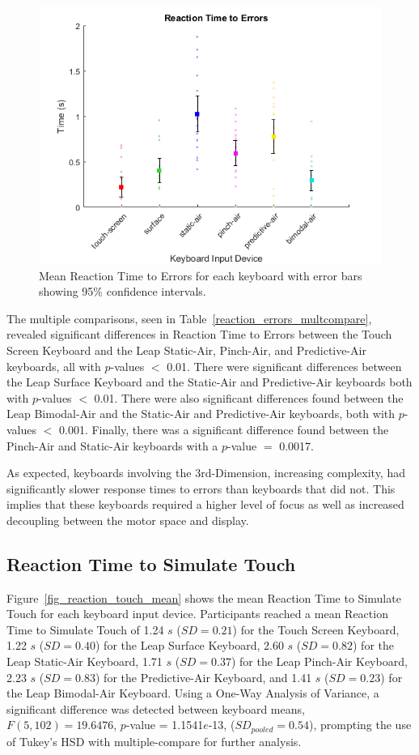 \begin{figure}[h]
	\centering
	\includegraphics{fig_reaction_errors_mean}
	\caption[Mean Reaction Time to Errors]{Mean Reaction Time to Errors for each keyboard with error bars showing 95\% confidence intervals.}
	\label{fig_reaction_errors_mean}
\end{figure}

The multiple comparisons, seen in Table~\ref{reaction_errors_multcompare}, revealed significant differences in Reaction Time to Errors between the Touch Screen Keyboard and the Leap Static-Air, Pinch-Air, and Predictive-Air keyboards, all with $p$-values $<$ 0.01. There were significant differences between the Leap Surface Keyboard and the Static-Air and Predictive-Air keyboards both with $p$-values $<$ 0.01. There were also significant differences found between the Leap Bimodal-Air and the Static-Air and Predictive-Air keyboards, both with $p$-values $<$ 0.001. Finally, there was a significant difference found between the Pinch-Air and Static-Air keyboards with a $p$-value $=$ 0.0017.

As expected, keyboards involving the 3rd-Dimension, increasing complexity, had significantly slower response times to errors than keyboards that did not. This implies that these keyboards required a higher level of focus as well as increased decoupling between the motor space and display.

\subsection{Reaction Time to Simulate Touch}
Figure~\ref{fig_reaction_touch_mean} shows the mean Reaction Time to Simulate Touch for each keyboard input device. Participants reached a mean Reaction Time to Simulate Touch of 1.24 $s$ ($SD = 0.21$) for the Touch Screen Keyboard, 1.22 $s$ ($SD = 0.40$) for the Leap Surface Keyboard, 2.60 $s$ ($SD = 0.82$) for the Leap Static-Air Keyboard, 1.71 $s$ ($SD = 0.37$) for the Leap Pinch-Air Keyboard, 2.23 $s$ ($SD = 0.83$) for the Predictive-Air Keyboard, and 1.41 $s$ ($SD = 0.23$) for the Leap Bimodal-Air Keyboard. Using a One-Way Analysis of Variance, a significant difference was detected between keyboard means, $F(5, 102) = 19.6476$, $p$-value = 1.1541$e$-13, ($SD_{pooled} = 0.54$), prompting the use of Tukey's HSD with multiple-compare for further analysis.

